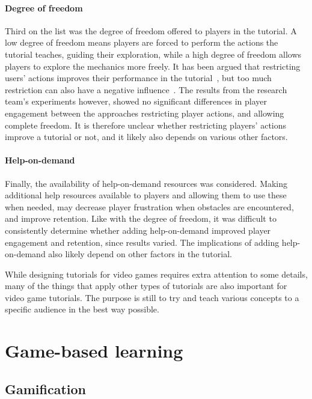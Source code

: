 \paragraph{Degree of freedom} Third on the list was the degree of freedom offered to players in the tutorial. A low degree of freedom means players are forced to perform the actions the tutorial teaches, guiding their exploration, while a high degree of freedom allows players to explore the mechanics more freely. It has been argued that restricting users' actions improves their performance in the tutorial~\cite{kelleher:stencils}, but too much restriction can also have a negative influence~\cite{bonawitz:double_edged_pedagogy}. The results from the research team's experiments however, showed no significant differences in player engagement between the approaches restricting player actions, and allowing complete freedom. It is therefore unclear whether restricting players' actions improve a tutorial or not, and it likely also depends on various other factors.

\paragraph{Help-on-demand} Finally, the availability of help-on-demand resources was considered. Making additional help resources available to players and allowing them to use these when needed, may decrease player frustration when obstacles are encountered, and improve retention. Like with the degree of freedom, it was difficult to consistently determine whether adding help-on-demand improved player engagement and retention, since results varied. The implications of adding help-on-demand also likely depend on other factors in the tutorial.

\noindent
While designing tutorials for video games requires extra attention to some details, many of the things that apply other types of tutorials are also important for video game tutorials. The purpose is still to try and teach various concepts to a specific audience in the best way possible.

\section{Game-based learning}
\label{sec:game_based_learning}

\subsection{Gamification}


